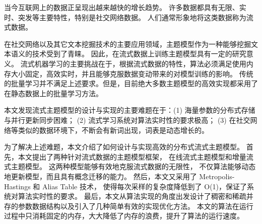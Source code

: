 \begin{cabstract}
当今互联网上的数据正呈现出越来越快的增长趋势。
许多数据都具有无限、实时、突发等主要特性，特别是社交网络数据。
人们通常形象地将这类数据称为流式数据。

在社交网络以及其它文本挖掘技术的主要应用领域，主题模型作为一种能够挖掘文本语义的技术受到了青睐。
因此，在流式数据上训练主题模型具有一定的研究意义。
流式机器学习的主要挑战在于，根据流式数据的特性，算法必须满足使用内存大小固定，高效实时，并且能够克服数据变动带来的对模型训练的影响。
传统的批量学习并不满足上述要求。但是，目前绝大多数主题模型的高效实现都采用了在静态数据上的批量学习方法。

本文发现流式主题模型的设计与实现的主要难题在于：(1) 海量参数的分布式存储与并行更新同步困难；
(2) 流式学习系统对算法实时性的要求极高；
(3) 在社交网络等类似的数据环境下，不断会有新词出现，词表是动态增长的。

为了解决上述难题，本文介绍了如何设计与实现高效的分布式流式主题模型。
首先，本文提出了两种针对流式数据的主题模型框架，
在线流式主题模型和增量流式主题模型。
这两种模型能够有效地克服流式数据的无限性，
不仅算法能够动态地更新模型，而且具有概念迁移的能力。
然后，本文又采用了 Metropolis-Hastings 和 Alias Table 技术，
使得每次采样的复杂度降低到了 O(1)，保证了系统对算法实时性的要求。
最后，本文从算法实现的角度出发设计了稠密和稀疏并存的参数数据结构以及引入了几种简单有效的实现优化方法。
本文的算法在运行过程中只消耗固定的内存，大大降低了内存的浪费，提升了算法的运行速度。

\end{cabstract}


